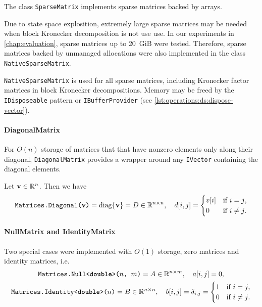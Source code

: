 The class \texttt{SparseMatrix} implements  sparse
matrices backed by  arrays.

Due to state space explosition, extremely large sparse matrices may be
needed when block Kronecker decomposition is not use use. In our
experiments in \cref{chap:evaluation}, sparse matrices up to 20~GiB
were tested. Therefore, sparse matrices backed by unmanaged
allocations were also implemented in the class
\texttt{NativeSparseMatrix}.

\texttt{NativeSparseMatrix} is used for all sparse matrices, including
Kronecker factor matrices in block Kronecker decompositions. Memory
may be freed by the \texttt{IDisposeable} pattern or
\texttt{IBufferProvider} (see
\vref{lst:operations:ds:dispose-vector}).

\paragraph{DiagonalMatrix}

For $O(n)$ storage of matrices that that have nonzero elements only
along their diagonal, \texttt{DiagonalMatrix} provides a wrapper
around any \texttt{IVector} containing the diagonal
elements.

Let $\bm{\mathrm{v}} \in \mathbb{R}^n$. Then we have
\begin{equation}
  \texttt{Matrices.Diagonal($\bm{\mathrm{v}}$)} = \operatorname{diag} \{ \bm{\mathrm{v}} \} = D \in
  \mathbb{R}^{n \times n}, \quad d[i, j] = \begin{cases}
    v[i] & \text{if $i = j$,} \\
    0 & \text{if $i \ne j$.}
  \end{cases}
\end{equation}

\paragraph{NullMatrix and IdentityMatrix}

Two special cases were implemented with $O(1)$ storage, zero matrices
and identity matrices, i.e.
\begin{gather}
  \texttt{Matrices.Null<\textbf{double}>($n$, $m$)} = A \in \mathbb{R}^{n
    \times m}, \quad a[i, j] = 0, \\
  \texttt{Matrices.Identity<\textbf{double}>($n$)}
  = B \in \mathbb{R}^{n \times n}, \quad b[i, j] = \delta_{i, j} =
  \begin{cases}
    1 & \text{if $i = j$,} \\
    0 & \text{if $i \ne j$.}
  \end{cases}  
\end{gather}

